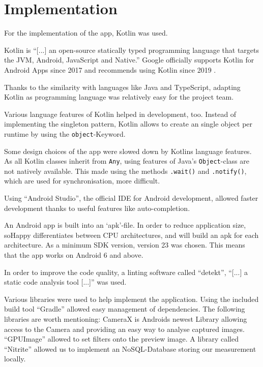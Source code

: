 \section{Implementation} \label{sec:implementation}

For the implementation of the app, Kotlin was used.

Kotlin is ``[...] an open-source statically typed programming language
that targets the JVM, Android, JavaScript and Native.'' \cite{kotlin2020}
Google officially supports Kotlin for Android Apps since 2017
\cite{googleio2017} and recommends using Kotlin since 2019
\cite{androidkotlin2019}.

Thanks to the similarity with languages like Java and TypeScript, adapting
Kotlin as programming language was relatively easy for the project team.

Various language features of Kotlin helped in development, too. Instead of
implementing the singleton pattern, Kotlin allows to create an single object
per runtime by using the \texttt{object}-Keyword.

Some design choices of the app were slowed down by Kotlins language features.
As all Kotlin classes inherit from \texttt{Any}, using features of Java's 
\texttt{Object}-class are not natively available. This made using the methods
\texttt{.wait()} and \texttt{.notify()}, which are used for synchronisation,
more difficult.

Using ``Android Studio'', the official IDE for Android development, allowed
faster development thanks to useful features like auto-completion. 

An Android app is built into an `apk'-file. In order to reduce application
size, soHappy differentiates between CPU architectures, and will
build an apk for each architecture. As a minimum SDK version, version 23
was chosen. This means that the app works on Android 6 and above.

In order to improve the code quality, a linting software called ``detekt'',
``[...] a static code analysis tool [...]''\cite{detekt2020} was used.

Various libraries were used to help implement the application. Using
the included build tool ``Gradle'' \cite{gradle} allowed easy management of 
dependencies. The following libraries are worth mentioning: CameraX 
\cite{camerax} is Androids newest Library allowing access to the Camera and 
providing an easy way to analyse captured images. ``GPUImage'' \cite{gpuimage}
allowed to set filters onto the preview image. A library called ``Nitrite''
\cite{nitrite} allowed us to implement an NoSQL-Database 
storing our measurement locally.

